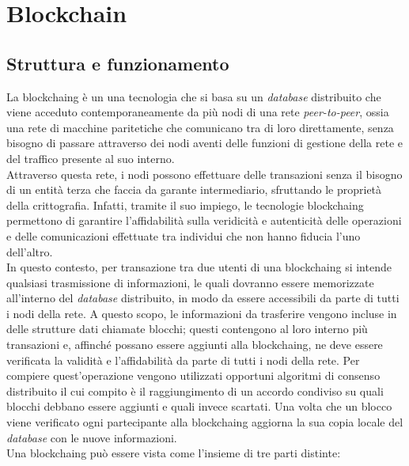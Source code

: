 
\chapter{Blockchain}
\label{cap:blockchain}

\section{Struttura e funzionamento}

La \gls{blockchaing} è un una tecnologia che si basa su un \textit{database} distribuito che viene acceduto contemporaneamente da più nodi di una rete \textit{peer-to-peer}, ossia una rete di macchine paritetiche che comunicano tra di loro direttamente, senza bisogno di passare attraverso dei nodi aventi delle funzioni di gestione della rete e del traffico presente al suo interno.\\
Attraverso questa rete, i nodi possono effettuare delle transazioni senza il bisogno di un entità terza che faccia da garante intermediario, sfruttando le proprietà della crittografia. Infatti, tramite il suo impiego, le tecnologie \gls{blockchaing} permettono di garantire l'affidabilità sulla veridicità e autenticità delle operazioni e delle comunicazioni effettuate tra individui che non hanno fiducia l'uno dell'altro.\\
In questo contesto, per transazione tra due utenti di una \gls{blockchaing} si intende qualsiasi trasmissione di informazioni, le quali dovranno essere memorizzate all'interno del \textit{database} distribuito, in modo da essere accessibili da parte di tutti i nodi della rete. A questo scopo, le informazioni da trasferire vengono incluse in delle strutture dati chiamate blocchi; questi contengono al loro interno più transazioni e, affinché possano essere aggiunti alla \gls{blockchaing}, ne deve essere verificata la validità e l'affidabilità da parte di tutti i nodi della rete. Per compiere quest'operazione vengono utilizzati opportuni algoritmi di consenso distribuito il cui compito è il raggiungimento di un accordo condiviso su quali blocchi debbano essere aggiunti e quali invece scartati. Una volta che un blocco viene verificato ogni partecipante alla \gls{blockchaing} aggiorna la sua copia locale del \textit{database} con le nuove informazioni.\\
Una \gls{blockchaing} può essere vista come l'insieme di tre parti distinte:


